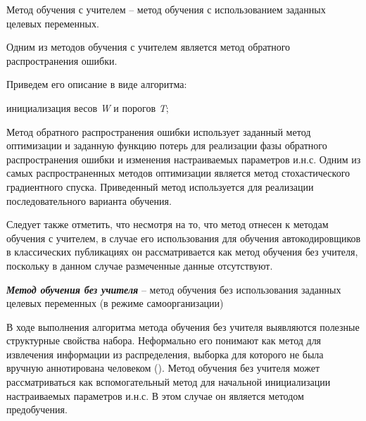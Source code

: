 Метод обучения с учителем -- метод обучения с использованием заданных целевых переменных.

Одним из методов обучения с учителем является метод обратного распространения ошибки.

Приведем его описание в виде алгоритма:

\begin{algorithm}[H]
	инициализация весов \textit{W} и порогов \textit{T};\\
\end{algorithm}

Метод обратного распространения ошибки использует заданный метод оптимизации и заданную функцию потерь для реализации фазы обратного распространения ошибки и изменения настраиваемых параметров и.н.с. Одним из самых распространенных методов оптимизации является метод стохастического градиентного спуска. Приведенный метод используется для реализации последовательного варианта обучения.

Следует также отметить, что несмотря на то, что метод отнесен к методам обучения с учителем, в случае
его использования для обучения автокодировщиков в классических публикациях он рассматривается как
метод обучения без учителя, поскольку в данном случае размеченные данные отсутствуют.

\textbf{\textit{Метод обучения без учителя}} -- метод обучения без использования заданных целевых переменных (в режиме самоорганизации)

В ходе выполнения алгоритма метода обучения без учителя выявляются полезные структурные свойства
набора. Неформально его понимают как метод для извлечения информации из распределения, выборка для которого
не была вручную аннотирована человеком (). Метод обучения без учителя может рассматриваться как вспомогательный метод для начальной инициализации настраиваемых параметров и.н.с. В этом случае он является методом предобучения.

